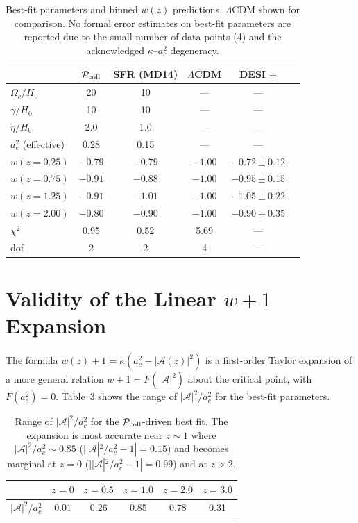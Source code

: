 \documentclass[aps,prd,onecolumn]{revtex4-2}
\begin{document}
\begin{table}[h]
\centering
\caption{Best-fit parameters and binned $w(z)$ predictions. $\Lambda$CDM shown for comparison. No formal error estimates on best-fit parameters are reported due to the small number of data points (4) and the acknowledged $\kappa$--$a_c^2$ degeneracy.}
\begin{tabular}{lccccc}
\toprule
 & $\mathcal{P}_{\rm coll}$ & SFR (MD14) & $\Lambda$CDM & DESI $\pm$ \\
\midrule
$\Omega_c/H_0$ & 20 & 10 & --- & --- \\
$\gamma/H_0$ & 10 & 10 & --- & --- \\
$\tilde{\eta}/H_0$ & 2.0 & 1.0 & --- & --- \\
$a_c^2$ (effective) & 0.28 & 0.15 & --- & --- \\
\midrule
$w(z=0.25)$ & $-0.79$ & $-0.79$ & $-1.00$ & $-0.72 \pm 0.12$ \\
$w(z=0.75)$ & $-0.91$ & $-0.88$ & $-1.00$ & $-0.95 \pm 0.15$ \\
$w(z=1.25)$ & $-0.91$ & $-1.01$ & $-1.00$ & $-1.05 \pm 0.22$ \\
$w(z=2.00)$ & $-0.80$ & $-0.90$ & $-1.00$ & $-0.90 \pm 0.35$ \\
\midrule
$\chi^2$ & 0.95 & 0.52 & 5.69 & --- \\
dof & 2 & 2 & 4 & --- \\
\bottomrule
\end{tabular}
\label{sm:tab_results}
\end{table}

\section{Validity of the Linear $w+1$ Expansion}

The formula $w(z)+1 = \kappa(a_c^2 - |\mathcal{A}(z)|^2)$ is a first-order Taylor expansion of a more general relation $w+1 = F(|\mathcal{A}|^2)$ about the critical point, with $F(a_c^2) = 0$. Table~3 shows the range of $|\mathcal{A}|^2/a_c^2$ for the best-fit parameters.

\begin{table}[h]
\centering
\caption{Range of $|\mathcal{A}|^2/a_c^2$ for the $\mathcal{P}_{\rm coll}$-driven best fit. The expansion is most accurate near $z \sim 1$ where $|\mathcal{A}|^2/a_c^2 \sim 0.85$ ($||\mathcal{A}|^2/a_c^2 - 1| = 0.15$) and becomes marginal at $z=0$ ($||\mathcal{A}|^2/a_c^2 - 1| = 0.99$) and at $z > 2$.}
\begin{tabular}{lccccc}
\toprule
 & $z=0$ & $z=0.5$ & $z=1.0$ & $z=2.0$ & $z=3.0$ \\
\midrule
$|\mathcal{A}|^2/a_c^2$ & 0.01 & 0.26 & 0.85 & 0.78 & 0.31 \\
\bottomrule
\end{tabular}
\label{sm:tab_range}
\end{table}
\end{document}
